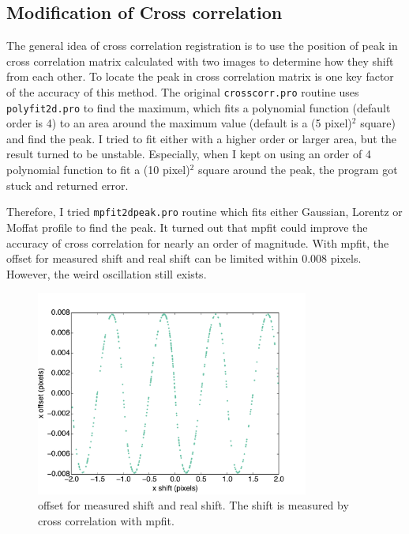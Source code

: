 \documentclass[paper=letter, fontsize=11pt]{scrartcl} %
\numberwithin{equation}{section} %
\numberwithin{figure}{section} %
\numberwithin{table}{section} %
\begin{document}
\subsection{Modification of  Cross correlation}
The general idea of cross correlation registration is to use the
position of peak  in cross correlation matrix calculated with
two images to determine how they shift from each other.  To locate the
peak in cross correlation matrix is one key factor of the accuracy of
this method. The original \texttt{crosscorr.pro} routine uses
\texttt{polyfit2d.pro} to find the maximum, which fits a polynomial
function (default order is 4) to an area around the maximum
value (default is a (5 pixel)$^{2}$ square) and find the peak. I tried
to fit either with a higher order or larger area, but the result turned to
be unstable. Especially, when I kept on using an order of 4 polynomial
function to fit a (10 pixel)$^{2}$ square around the peak, the program
got stuck and returned error.\par

Therefore, I tried \texttt{mpfit2dpeak.pro} routine which fits either
Gaussian, Lorentz or Moffat profile  to find the peak. It turned out
that  mpfit could improve the accuracy of cross correlation for
nearly an order of magnitude. With mpfit, the offset for measured
shift and real shift can be limited within 0.008 pixels. However, the
weird oscillation still exists.\par

\begin{figure}[h]
  \centering
  \includegraphics[width=0.8\textwidth]{crosscorr_cenTest2}
  \caption{offset for measured shift and real shift. The shift is measured by cross correlation with mpfit.}
\end{figure}
\end{document}
